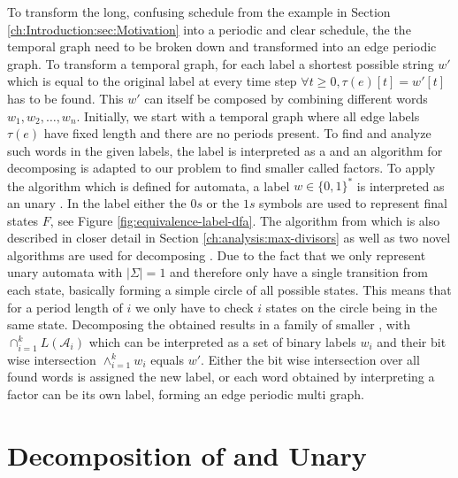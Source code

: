 To transform the long, confusing schedule from the example in Section \ref{ch:Introduction:sec:Motivation} into a periodic and clear schedule, the the temporal graph need to be broken down and transformed into an edge periodic graph.
To transform a temporal graph, for each label a shortest possible string $w'$ which is equal to the original label at every time step $\forall t \geq 0, \tau(e)[t] = w'[t]$ has to be found.
This $w'$ can itself be composed by combining different words $w_1,w_2,\dots,w_n$.
Initially, we start with a temporal graph where all edge labels $\tau(e)$ have fixed length and there are no periods present.
To find and analyze such words in the given labels, the label is interpreted as a \DFA and an algorithm for decomposing \DFAs is adapted to our problem to find smaller \DFAs called factors.
To apply the algorithm which is defined for automata, a label $ w \in \{0,1\}^*$ is interpreted as an unary \DFA.
In the label either the $0s$ or the $1s$ symbols are used to represent final states $F$, see Figure \ref{fig:equivalence-label-dfa}.
The algorithm from \cite{DBLP:journals/corr/abs-2107-04683} which is also described in closer detail in Section \ref{ch:analysis:max-divisors} as well as two novel algorithms are used for decomposing \DFAs.
Due to the fact that we only represent unary automata with \textbf{$|\Sigma| = 1$} and therefore only have a single transition from each state, basically forming a simple circle of all possible states.
This means that for a period length of $i$ we only have to check $i$ states on the circle being in the same state.
Decomposing the obtained \DFA results in a family of smaller \DFAs, with $\cap^k_{i=1} L(\mathcal{A}_i)$ which can be interpreted as a set of binary labels $w_i$ and their bit wise intersection $\land^k_{i=1} w_i$ equals $w'$.
Either the bit wise intersection over all found words is assigned the new label, or each word obtained by interpreting a factor can be its own label, forming an edge periodic multi graph. 

\section{Decomposition of \DFAs and Unary \DFAs}
\label{ch:analysis:decomposition-unary-dfas}

